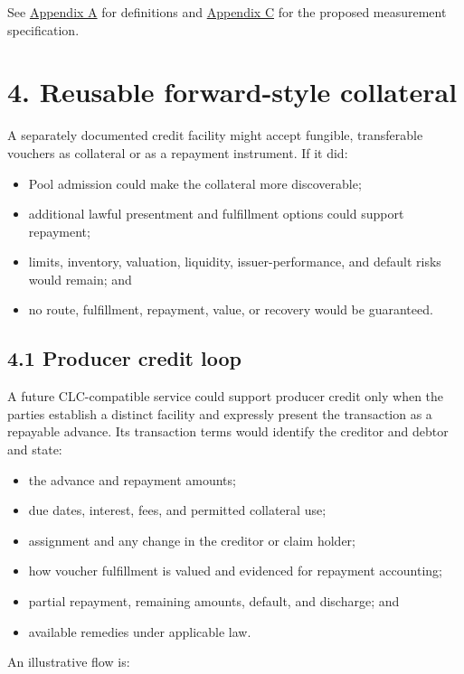 \documentclass[11pt]{article}
\begin{document}
See \href{https://docs.cosmolocal.credit/white-paper/appendix-a-math-box}{Appendix A} for definitions and \href{https://docs.cosmolocal.credit/white-paper/appendix-c-kpi-definitions}{Appendix C} for the proposed measurement specification.


\section*{4. Reusable forward-style collateral}

A separately documented credit facility might accept fungible, transferable vouchers as collateral or as a repayment instrument. If it did:

\begin{itemize}[leftmargin=*]
\item Pool admission could make the collateral more discoverable;
\item additional lawful presentment and fulfillment options could support repayment;
\item limits, inventory, valuation, liquidity, issuer-performance, and default risks would remain; and
\item no route, fulfillment, repayment, value, or recovery would be guaranteed.
\end{itemize}
\subsection*{4.1 Producer credit loop}

A future CLC-compatible service could support producer credit only when the parties establish a distinct facility and expressly present the transaction as a repayable advance. Its transaction terms would identify the creditor and debtor and state:

\begin{itemize}[leftmargin=*]
\item the advance and repayment amounts;
\item due dates, interest, fees, and permitted collateral use;
\item assignment and any change in the creditor or claim holder;
\item how voucher fulfillment is valued and evidenced for repayment accounting;
\item partial repayment, remaining amounts, default, and discharge; and
\item available remedies under applicable law.
\end{itemize}
An illustrative flow is:
\end{document}
